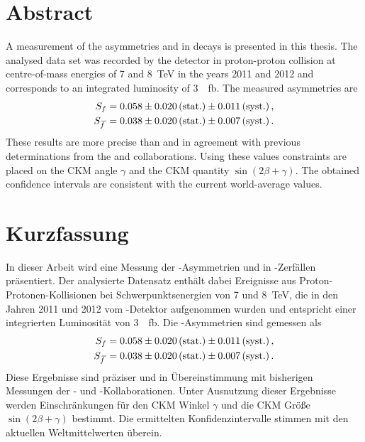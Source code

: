 \section*{Abstract}

\linespread{1.08}\selectfont
A measurement of the \CP asymmetries \Sf and \Sfbar in \BdToDpi decays is presented in this thesis.
The analysed data set was recorded by the \lhcb detector in proton-proton collision  at centre-of-mass energies of \num{7} and \SI{8}{\tera\electronvolt} in the years \num{2011} and \num{2012} and corresponds to an integrated luminosity of \SI{3}{\per\femto\barn}.
The measured \mbox{\CP asymmetries} are
\begin{align}
\mbox{\ensuremath{S_{f}}}&=0.058\pm0.020\mathrm{\,(stat.)}\pm0.011\mathrm{\,(syst.)}\,,\nonumber\\
\mbox{\ensuremath{S_{\kern 1.5pt\overline{\kern -1.5pt f\kern 1.5pt}}}}&=0.038\pm0.020\mathrm{\,(stat.)}\pm0.007\mathrm{\,(syst.)}\,.\nonumber
\end{align}
These results are more precise than and in agreement with previous determinations from the \belle and \babar collaborations.
Using these values constraints are placed on the CKM angle $\gamma$ and the CKM quantity $\sin\!\left(2\beta+\gamma\right)$.
The obtained confidence intervals are consistent with the current world-average values.

\section*{Kurzfassung}

\linespread{1.08}\selectfont
In dieser Arbeit wird eine Messung der \CP-Asymmetrien \Sf und \Sfbar in \mbox{\BdToDpi}-Zerfällen präsentiert.
Der analysierte Datensatz enthält dabei Ereignisse aus Proton-Protonen-Kollisionen bei Schwerpunktsenergien von \num{7} und \SI{8}{\tera\electronvolt}, die in den Jahren \num{2011} und \num{2012} vom \lhcb-Detektor aufgenommen wurden und entspricht einer integrierten Luminosität von \SI{3}{\per\femto\barn}.
Die \mbox{\CP-Asymmetrien} sind gemessen als
\begin{align}
\mbox{\ensuremath{S_{f}}}&=0.058\pm0.020\mathrm{\,(stat.)}\pm0.011\mathrm{\,(syst.)}\,,\nonumber\\
\mbox{\ensuremath{S_{\kern 1.5pt\overline{\kern -1.5pt f\kern 1.5pt}}}}&=0.038\pm0.020\mathrm{\,(stat.)}\pm0.007\mathrm{\,(syst.)}\,.\nonumber
\end{align}
Diese Ergebnisse sind präziser und in Übereinstimmung mit bisherigen Messungen der \belle- und \babar-Kollaborationen.
Unter Ausnutzung dieser Ergebnisse werden Einschränkungen für den CKM Winkel $\gamma$ und die CKM Größe $\sin\!\left(2\beta+\gamma\right)$ bestimmt.
Die ermittelten Konfidenzintervalle stimmen mit den aktuellen Weltmittelwerten überein.
